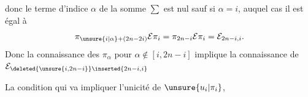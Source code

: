 donc le terme d'indice $\alpha$ de la somme $\sum$ est nul sauf si $\alpha=i$, auquel cas il est égal à
\[
\pi_{\unsure{i|\alpha}+(2n-2i)}\mathcal E\pi_i=\pi_{2n-i}\mathcal E\pi_i=\mathcal E_{2n-i,i}.
\]
Donc la connaissance des $\pi_\alpha$ pour $\alpha\notin[i,2n-i]$ implique la connaissance de $\mathcal E_{\deleted{\unsure{i,2n-i}}\inserted{2n-i,i}}$ 

La condition qui va impliquer l'unicité  de $\unsure{u_i|\pi_i}$,
